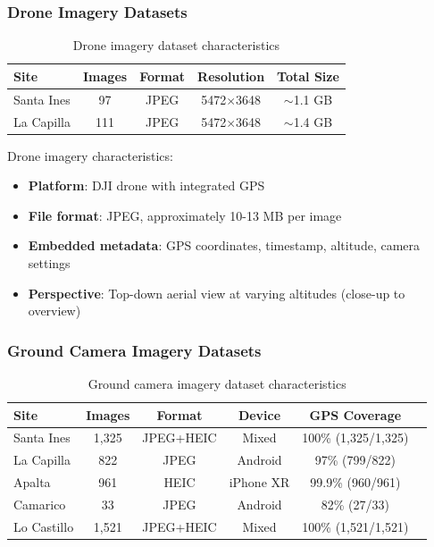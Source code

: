 
\subsubsection{Drone Imagery Datasets}

\begin{table}[H]
\centering
\caption{Drone imagery dataset characteristics}
\label{tab:drone_data}
\begin{tabular}{lcccc}
\toprule
\textbf{Site} & \textbf{Images} & \textbf{Format} & \textbf{Resolution} & \textbf{Total Size} \\
\midrule
Santa Ines & 97 & JPEG & 5472$\times$3648 & $\sim$1.1 GB \\
La Capilla & 111 & JPEG & 5472$\times$3648 & $\sim$1.4 GB \\
\bottomrule
\end{tabular}
\end{table}

Drone imagery characteristics:
\begin{itemize}
    \item \textbf{Platform}: DJI drone with integrated GPS
    \item \textbf{File format}: JPEG, approximately 10-13 MB per image
    \item \textbf{Embedded metadata}: GPS coordinates, timestamp, altitude, camera settings
    \item \textbf{Perspective}: Top-down aerial view at varying altitudes (close-up to overview)
\end{itemize}

\subsubsection{Ground Camera Imagery Datasets}

\begin{table}[H]
\centering
\caption{Ground camera imagery dataset characteristics}
\label{tab:ground_data}
\begin{tabular}{lccccc}
\toprule
\textbf{Site} & \textbf{Images} & \textbf{Format} & \textbf{Device} & \textbf{GPS Coverage} \\
\midrule
Santa Ines & 1,325 & JPEG+HEIC & Mixed & 100\% (1,325/1,325) \\
La Capilla & 822 & JPEG & Android & 97\% (799/822) \\
Apalta & 961 & HEIC & iPhone XR & 99.9\% (960/961) \\
Camarico & 33 & JPEG & Android & 82\% (27/33) \\
Lo Castillo & 1,521 & JPEG+HEIC & Mixed & 100\% (1,521/1,521) \\
\bottomrule
\end{tabular}
\end{table}

